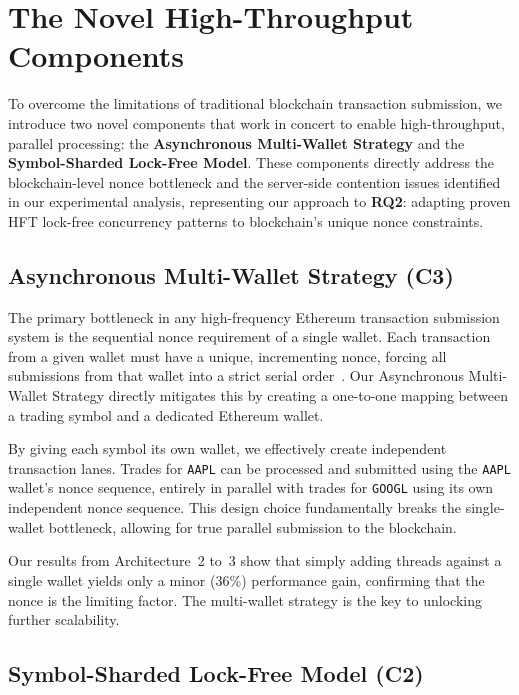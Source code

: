 \section{The Novel High-Throughput Components}
\label{sec:components}

To overcome the limitations of traditional blockchain transaction submission, we introduce two novel components that work in concert to enable high-throughput, parallel processing: the \textbf{Asynchronous Multi-Wallet Strategy} and the \textbf{Symbol-Sharded Lock-Free Model}. These components directly address the blockchain-level nonce bottleneck and the server-side contention issues identified in our experimental analysis, representing our approach to \textbf{RQ2}: adapting proven HFT lock-free concurrency patterns to blockchain's unique nonce constraints.

\subsection{Asynchronous Multi-Wallet Strategy (C3)}

The primary bottleneck in any high-frequency Ethereum transaction submission system is the sequential nonce requirement of a single wallet. Each transaction from a given wallet must have a unique, incrementing nonce, forcing all submissions from that wallet into a strict serial order~\cite{alchemy2024nonce}. Our Asynchronous Multi-Wallet Strategy directly mitigates this by creating a one-to-one mapping between a trading symbol and a dedicated Ethereum wallet.

By giving each symbol its own wallet, we effectively create independent transaction lanes. Trades for \texttt{AAPL} can be processed and submitted using the \texttt{AAPL} wallet's nonce sequence, entirely in parallel with trades for \texttt{GOOGL} using its own independent nonce sequence. This design choice fundamentally breaks the single-wallet bottleneck, allowing for true parallel submission to the blockchain.

Our results from Architecture~2 to~3 show that simply adding threads against a single wallet yields only a minor (36\%) performance gain, confirming that the nonce is the limiting factor. The multi-wallet strategy is the key to unlocking further scalability.

\subsection{Symbol-Sharded Lock-Free Model (C2)}

